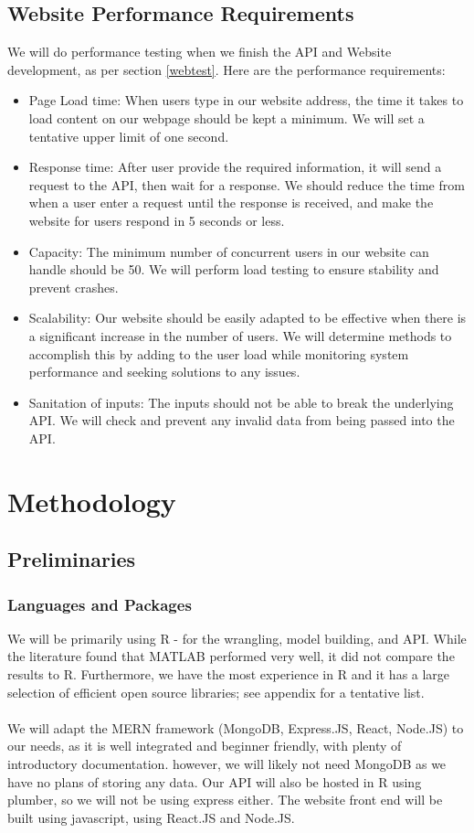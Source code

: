 \documentclass[a4paper, 12pt]{article}
\begin{document}
    \subsection{Website Performance Requirements} \label{webreq}
We will do performance testing when we finish the API and Website development, as per section \ref{webtest}. Here are the performance requirements:
\begin{itemize}
    \item Page Load time: When users type in our website address, the time it takes to load content on our webpage should be kept a minimum. We will set a tentative upper limit of one second.
    \item Response time: After user provide the required information, it will send a request to the API, then wait for a response. We should reduce the time from when a user enter a request until the response is received, and make the website for users respond in 5 seconds or less.
    \item Capacity: The  minimum number of concurrent users in our website can handle should be 50. We will perform load testing to ensure stability and prevent crashes.
    \item Scalability: Our website should be easily adapted to be effective when there is a significant increase in the number of users. We will determine methods to accomplish this by adding to the user load while monitoring system performance and seeking solutions to any issues.
    \item Sanitation of inputs: The inputs should not be able to break the underlying API. We will check and prevent any invalid data from being passed into the API.
\end{itemize}

\section{Methodology}
    \subsection{Preliminaries}
        \subsubsection{Languages and Packages}
        We will be primarily using R - for the wrangling, model building, and API. While the literature found that MATLAB performed very well, it did not compare the results to R. Furthermore, we have the most experience in R and it has a large selection of efficient open source libraries; see appendix for a tentative list.
        \\\\
        We will adapt the MERN framework (MongoDB, Express.JS, React, Node.JS) to our needs, as it is well integrated and beginner friendly, with plenty of introductory documentation. however, we will likely not need MongoDB as we have no plans of storing any data. Our API will also be hosted in R using plumber, so we will not be using express either.
        The website front end will be built using javascript, using React.JS and Node.JS.
        
\end{document}
